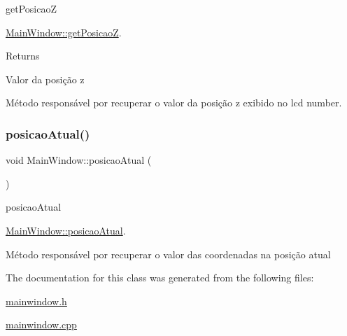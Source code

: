 get\+PosicaoZ 

\mbox{\hyperlink{classMainWindow_a91cc6b0f1be1fae34eae724789370906}{Main\+Window\+::get\+PosicaoZ}}.

\begin{DoxyReturn}{Returns}


Valor da posição z
\end{DoxyReturn}
Método responsável por recuperar o valor da posição z exibido no lcd number. \mbox{\label{classMainWindow_aaa69318d2e78939d276d2aff84b66fae}} 
\subsubsection{\texorpdfstring{posicaoAtual()}{posicaoAtual()}}
{\footnotesize\ttfamily void Main\+Window\+::posicao\+Atual (\begin{DoxyParamCaption}{ }\end{DoxyParamCaption})}



posicao\+Atual 

\mbox{\hyperlink{classMainWindow_aaa69318d2e78939d276d2aff84b66fae}{Main\+Window\+::posicao\+Atual}}.

Método responsável por recuperar o valor das coordenadas na posição atual 

The documentation for this class was generated from the following files\+:\begin{DoxyCompactItemize}
\item 
\mbox{\hyperlink{mainwindow_8h}{mainwindow.\+h}}\item 
\mbox{\hyperlink{mainwindow_8cpp}{mainwindow.\+cpp}}\end{DoxyCompactItemize}
